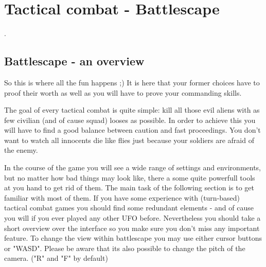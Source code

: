 
%
%


\chapter{Tactical combat - Battlescape}

.

\section{Battlescape - an overview}
So this is where all the fun happens ;) It is here that your former choices have to proof their worth as well as you will have to prove your commanding skills.

The goal of every tactical combat is quite simple: kill all those evil aliens with as few civilian (and of cause squad) looses as possible. In order to achieve this you will have to find a good balance between caution and fast proceedings. You don't want to watch all innocents die like flies just because your soldiers are afraid of the enemy.

In the course of the game you will see a wide range of settings and environments, but no matter how bad things may look like, there a some quite powerfull tools at you hand to get rid of them. The main task of the following section is to get familiar with most of them. If you have some experience with (turn-based) tactical combat games you should find some redundant elements - and of cause you will if you ever played any other UFO before. Nevertheless you should take a short overview over the interface so you make sure you don't miss any important feature. To change the view within battlescape you may use either cursor buttons or "WASD". Please be aware that its also possible to change the pitch of the camera. ("R" and "F" by default)

